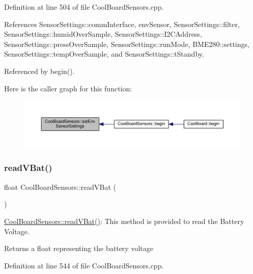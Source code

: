 Definition at line 504 of file Cool\+Board\+Sensors.\+cpp.



References Sensor\+Settings\+::comm\+Interface, env\+Sensor, Sensor\+Settings\+::filter, Sensor\+Settings\+::humid\+Over\+Sample, Sensor\+Settings\+::\+I2\+C\+Address, Sensor\+Settings\+::press\+Over\+Sample, Sensor\+Settings\+::run\+Mode, B\+M\+E280\+::settings, Sensor\+Settings\+::temp\+Over\+Sample, and Sensor\+Settings\+::t\+Standby.



Referenced by begin().

Here is the caller graph for this function\+:
\nopagebreak
\begin{figure}[H]
\begin{center}
\leavevmode
\includegraphics[width=350pt]{de/d46/class_cool_board_sensors_a406307ffd70272282d91479c7ed8d66f_icgraph}
\end{center}
\end{figure}
\mbox{\label{class_cool_board_sensors_a6944b6ea7bce8e2fce1b434acfd9d5f3}} 
\subsubsection{\texorpdfstring{read\+V\+Bat()}{readVBat()}}
{\footnotesize\ttfamily float Cool\+Board\+Sensors\+::read\+V\+Bat (\begin{DoxyParamCaption}{ }\end{DoxyParamCaption})}

\hyperlink{class_cool_board_sensors_a6944b6ea7bce8e2fce1b434acfd9d5f3}{Cool\+Board\+Sensors\+::read\+V\+Bat()}\+: This method is provided to read the Battery Voltage.

\begin{DoxyReturn}{Returns}
a float representing the battery voltage 
\end{DoxyReturn}


Definition at line 544 of file Cool\+Board\+Sensors.\+cpp.




